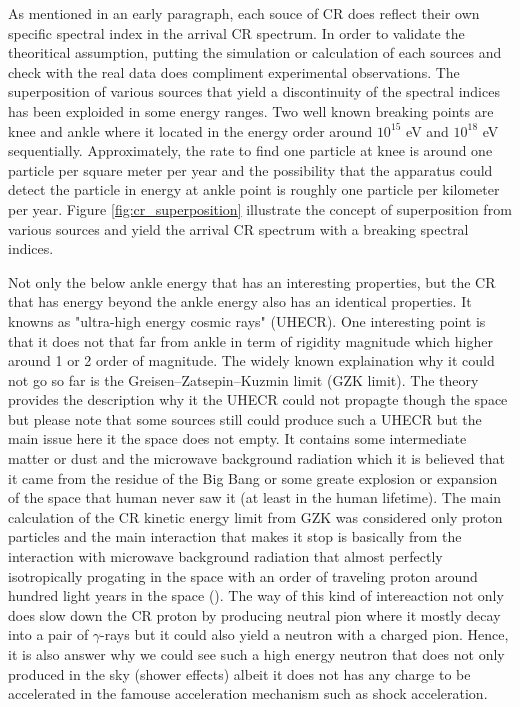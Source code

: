 As mentioned in an early paragraph, each souce of CR does reflect their
own specific spectral index in the arrival CR spectrum.
In order to validate the theoritical assumption, putting 
the simulation or calculation of each sources and check
with the real data does compliment experimental observations.
The superposition of various sources that yield a 
discontinuity of the spectral indices has been exploided
in some energy ranges. Two well known breaking points 
are knee and ankle where it located in the energy order 
around $10^{15}$ eV and $10^{18}$ eV sequentially.
Approximately, the rate to find one particle at knee
is around one particle per square meter per year and 
the possibility that the apparatus could detect the particle
in energy at ankle point is roughly one particle per 
kilometer per year. Figure \ref{fig:cr_superposition} illustrate
the concept of superposition from various sources and 
yield the arrival CR spectrum with a breaking spectral indices. 

Not only the below ankle energy that has an interesting
properties, but the CR that has energy beyond the ankle energy
also has an identical properties. It knowns as "ultra-high
energy cosmic rays" (UHECR). One interesting point is that it 
does not that far from ankle in term of rigidity magnitude
which higher around 1 or 2 order of magnitude. The widely known 
explaination why it could not go so far is the
Greisen–Zatsepin–Kuzmin limit (GZK limit).
The theory provides the description why it the UHECR
could not propagte though the space but please note that
some sources still could produce such a UHECR but the main
issue here it the space does not empty. It contains some 
intermediate matter or dust and the microwave background radiation
which it is believed that it came from the residue of the 
Big Bang or some greate explosion or expansion of the space that 
human never saw it (at least in the human lifetime).
The main calculation of the CR kinetic energy limit from GZK 
was considered only proton particles and the main interaction
that makes it stop is basically from the interaction with 
microwave background radiation that almost perfectly
isotropically progating in the space with an order of 
traveling proton around hundred light years in the space
(\cite{gzk_cr_limit}). The way of this kind of intereaction 
not only does slow down the CR proton by producing 
neutral pion where it mostly decay into a pair of $\gamma$-rays
but it could also yield a neutron with 
a charged pion. Hence, it is also answer why we could 
see such a high energy neutron that does not only 
produced in the sky (shower effects) albeit it does not
has any charge to be accelerated in the famouse 
acceleration mechanism such as shock acceleration.

